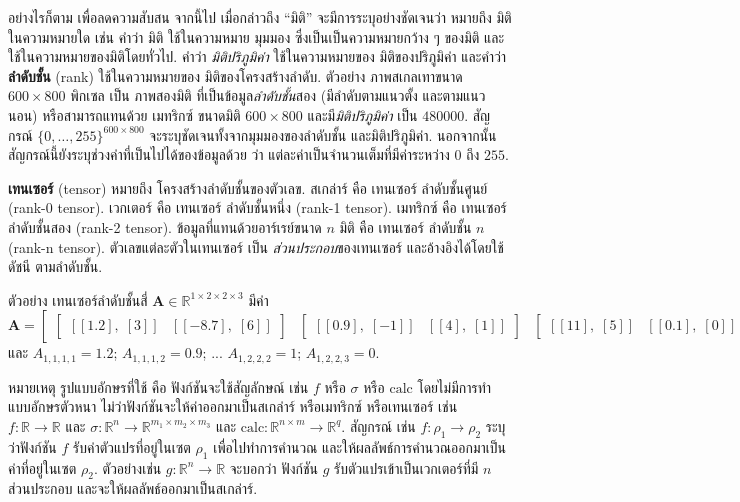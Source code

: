 อย่างไรก็ตาม เพื่อลดความสับสน จากนี้ไป เมื่อกล่าวถึง ``มิติ'' จะมีการระบุอย่างชัดเจนว่า หมายถึง มิติในความหมายใด 
เช่น
คำว่า มิติ ใช้ในความหมาย มุมมอง ซึ่งเป็นเป็นความหมายกว้าง ๆ ของมิติ
และใช้ในความหมายของมิติโดยทั่วไป.
คำว่า \textit{มิติปริภูมิค่า} ใช้ในความหมายของ มิติของปริภูมิค่า 
และคำว่า \textbf{ลำดับชั้น} (rank) ใช้ในความหมายของ มิติของโครงสร้างลำดับ.
ตัวอย่าง  
ภาพสเกลเทาขนาด $600 \times 800$ พิกเซล เป็น
ภาพสองมิติ 
ที่เป็นข้อมูล\textit{ลำดับชั้น}สอง (มีลำดับตามแนวตั้ง และตามแนวนอน)
หรือสามารถแทนด้วย
เมทริกซ์ ขนาดมิติ $600 \times 800$
และมี\textit{มิติปริภูมิค่า} เป็น $480000$.
สัญกรณ์ $\{0, \ldots, 255\}^{600 \times 800}$ จะระบุชัดเจนทั้งจากมุมมองของลำดับชั้น และมิติปริภูมิค่า.
นอกจากนั้น สัญกรณ์นี้ยังระบุช่วงค่าที่เป็นไปได้ของข้อมูลด้วย ว่า แต่ละค่าเป็นจำนวนเต็มที่มีค่าระหว่าง $0$ ถึง $255$.

\textbf{เทนเซอร์} (tensor) 
หมายถึง โครงสร้างลำดับชั้นของตัวเลข.
สเกล่าร์ คือ เทนเซอร์ ลำดับชั้นศูนย์ (rank-0 tensor).
เวกเตอร์ คือ เทนเซอร์ ลำดับชั้นหนึ่ง (rank-1 tensor).
เมทริกซ์ คือ เทนเซอร์ ลำดับชั้นสอง (rank-2 tensor).
ข้อมูลที่แทนด้วยอาร์เรย์ขนาด $n$ มิติ 
คือ เทนเซอร์ ลำดับชั้น $n$ (rank-n tensor).
ตัวเลขแต่ละตัวในเทนเซอร์ เป็น
\textit{ส่วนประกอบ}ของเทนเซอร์
และอ้างอิงได้โดยใช้ดัชนี ตามลำดับชั้น.

ตัวอย่าง เทนเซอร์ลำดับชั้นสี่ 
$\bm{A} \in \mathbb{R}^{1 \times 2 \times 2 \times 3}$ มีค่า
%
\[
\bm{A}
= \begin{bmatrix}
\begin{bmatrix}
[[1.2], \; [3]] & [[-8.7], \; [6]]
\end{bmatrix}
&
\begin{bmatrix}
[[0.9], \; [-1]] & [[4], \; [1]]
\end{bmatrix}
&
\begin{bmatrix}
[[11], \; [5]] & [[0.1], \; [0]]
\end{bmatrix}

\end{bmatrix}
\]
และ 
$A_{1,1,1,1} = 1.2$;
$A_{1,1,1,2} = 0.9$;
...
$A_{1,2,2,2} = 1$;
$A_{1,2,2,3} = 0$.

หมายเหตุ รูปแบบอักษรที่ใช้ คือ
ฟังก์ชันจะใช้สัญลักษณ์ เช่น $f$ หรือ $\sigma$ หรือ $\mathrm{calc}$ โดยไม่มีการทำแบบอักษรตัวหนา ไม่ว่าฟังก์ชันจะให้ค่าออกมาเป็นสเกล่าร์ หรือเมทริกซ์ หรือเทนเซอร์
เช่น $f: \mathbb{R} \rightarrow \mathbb{R}$
และ $\sigma: \mathbb{R}^n \rightarrow \mathbb{R}^{m_1 \times m_2 \times m_3}$
และ $\mathrm{calc}: \mathbb{R}^{n \times m} \rightarrow \mathbb{R}^q$.
สัญกรณ์ เช่น $f: \rho_1 \rightarrow \rho_2$
ระบุว่าฟังก์ชัน $f$ รับค่าตัวแปรที่อยู่ในเซต $\rho_1$ เพื่อไปทำการคำนวณ
และให้ผลลัพธ์การคำนวณออกมาเป็นค่าที่อยู่ในเซต $\rho_2$.
ตัวอย่างเช่น $g: \mathbb{R}^n \rightarrow \mathbb{R}$ จะบอกว่า 
ฟังก์ชัน $g$ รับตัวแปรเข้าเป็นเวกเตอร์ที่มี $n$ ส่วนประกอบ และจะให้ผลลัพธ์ออกมาเป็นสเกล่าร์.



